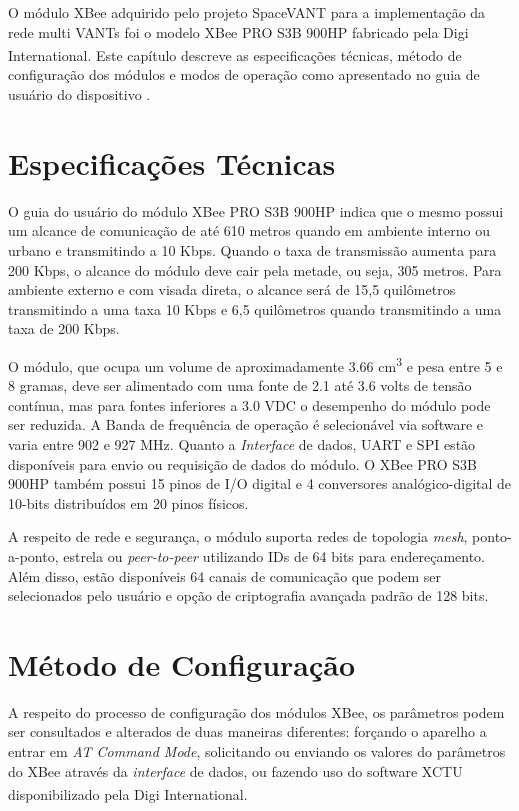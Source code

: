 \label{Cap:Xbee}

O módulo XBee adquirido pelo projeto SpaceVANT para a implementação da rede multi VANTs foi o modelo XBee PRO S3B 900HP fabricado pela Digi International\textsuperscript{\texttrademark}. Este capítulo descreve as especificações técnicas, método de configuração dos módulos e modos de operação como apresentado no guia de usuário do dispositivo \cite{xbeemanuals3}.

\section{Especificações Técnicas}

O guia do usuário do módulo XBee PRO S3B 900HP indica que o mesmo possui um alcance de comunicação de até 610 metros quando em ambiente interno ou urbano e transmitindo a 10 Kbps. Quando o taxa de transmissão aumenta para 200 Kbps, o alcance do módulo deve cair pela metade, ou seja, 305 metros. Para ambiente externo e com visada direta, o alcance será de 15,5 quilômetros transmitindo a uma taxa 10 Kbps e 6,5 quilômetros quando transmitindo a uma taxa de 200 Kbps.

O módulo, que ocupa um volume de aproximadamente 3.66 cm\textsuperscript{3} e pesa entre 5 e 8 gramas, deve ser alimentado com uma fonte de 2.1 até 3.6 volts de tensão contínua, mas para fontes inferiores a 3.0 VDC o desempenho do módulo pode ser reduzida. A Banda de frequência de operação é selecionável via software e varia entre 902 e 927 MHz. Quanto a \emph{Interface} de dados, UART e SPI estão disponíveis para envio ou requisição de dados do módulo. O XBee PRO S3B 900HP também possui 15 pinos de I/O digital e 4 conversores analógico-digital de 10-bits distribuídos em 20 pinos físicos.

A respeito de rede e segurança, o módulo suporta redes de topologia \emph{mesh}, ponto-a-ponto, estrela ou \emph{peer-to-peer} utilizando IDs de 64 bits para endereçamento. Além disso, estão disponíveis 64 canais de comunicação que podem ser selecionados pelo usuário e opção de criptografia avançada padrão de 128 bits.

\section{Método de Configuração}

A respeito do processo de configuração dos módulos XBee, os parâmetros podem ser consultados e alterados de duas maneiras diferentes: forçando o aparelho a entrar em \emph{AT Command Mode}, solicitando ou enviando os valores do parâmetros do XBee através da \emph{interface} de dados, ou fazendo uso do software XCTU disponibilizado pela Digi International\textsuperscript{\texttrademark}. 


